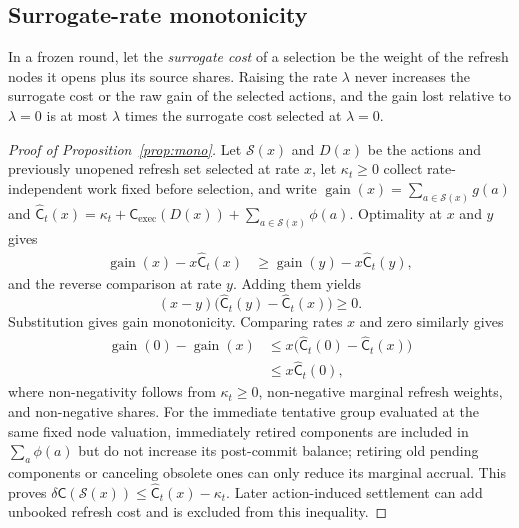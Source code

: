\subsection{Surrogate-rate monotonicity}\label{app:rate-proof}

\begin{proposition}\label{prop:frontier}\label{prop:price}\label{prop:mono}
In a frozen round, let the \emph{surrogate cost} of a selection be the weight of
the refresh nodes it opens plus its source shares. Raising the rate $\lambda$
never increases the surrogate cost or the raw gain of the selected actions, and
the gain lost relative to $\lambda=0$ is at most $\lambda$ times the surrogate
cost selected at $\lambda=0$.
\end{proposition}

\begin{proof}[Proof of Proposition~\ref{prop:mono}]
Let $\mathcal S(x)$ and $D(x)$ be the actions and previously unopened refresh
set selected at rate $x$, let $\kappa_t\ge0$ collect rate-independent work fixed
before selection, and write
$\operatorname{gain}(x)=\sum_{a\in\mathcal S(x)}g(a)$ and
$\widehat{\mathsf C}_t(x)=\kappa_t+\mathsf C_{\mathrm{exec}}(D(x))
+\sum_{a\in\mathcal S(x)}\phi(a)$.
Optimality at $x$ and $y$ gives
\begin{align*}
\operatorname{gain}(x)-x\widehat{\mathsf C}_t(x)
&\ge\operatorname{gain}(y)-x\widehat{\mathsf C}_t(y),
\end{align*}
and the reverse comparison at rate $y$. Adding them yields
\[
(x-y)\bigl(\widehat{\mathsf C}_t(y)
-\widehat{\mathsf C}_t(x)\bigr)\ge0.
\]
Substitution gives gain monotonicity. Comparing rates $x$ and zero similarly
gives
\begin{align*}
\operatorname{gain}(0)-\operatorname{gain}(x)
&\le x\bigl(\widehat{\mathsf C}_t(0)
             -\widehat{\mathsf C}_t(x)\bigr)\\
&\le x\widehat{\mathsf C}_t(0),
\end{align*}
where non-negativity follows from $\kappa_t\ge0$, non-negative marginal refresh
weights, and non-negative shares. For the immediate tentative group evaluated
at the same fixed node valuation,
immediately retired components are included in $\sum_a\phi(a)$ but do not
increase its post-commit balance; retiring old pending components or canceling
obsolete ones can only reduce its marginal accrual. This proves
$\delta\mathsf C(\mathcal S(x))\le\widehat{\mathsf C}_t(x)-\kappa_t$.
Later action-induced settlement can add unbooked refresh cost and is excluded
from this inequality.
\end{proof}

